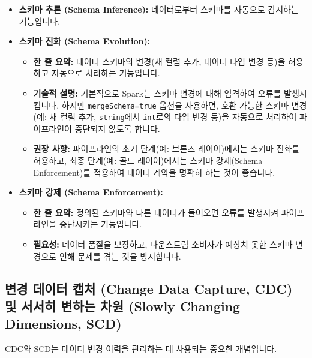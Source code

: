 \documentclass[11pt,a4paper]{article}
\theoremstyle{definition}
\begin{document}
\begin{itemize}
    \item \textbf{스키마 추론 (Schema Inference):} 데이터로부터 스키마를 자동으로 감지하는 기능입니다.
    \item \textbf{스키마 진화 (Schema Evolution):}
    \begin{itemize}
        \item \textbf{한 줄 요약:} 데이터 스키마의 변경(새 컬럼 추가, 데이터 타입 변경 등)을 허용하고 자동으로 처리하는 기능입니다.
        \item \textbf{기술적 설명:} 기본적으로 Spark는 스키마 변경에 대해 엄격하여 오류를 발생시킵니다. 하지만 \texttt{mergeSchema=true} 옵션을 사용하면, 호환 가능한 스키마 변경(예: 새 컬럼 추가, \texttt{string}에서 \texttt{int}로의 타입 변경 등)을 자동으로 처리하여 파이프라인이 중단되지 않도록 합니다.
        \item \textbf{권장 사항:} 파이프라인의 초기 단계(예: 브론즈 레이어)에서는 스키마 진화를 허용하고, 최종 단계(예: 골드 레이어)에서는 스키마 강제(Schema Enforcement)를 적용하여 데이터 계약을 명확히 하는 것이 좋습니다.
    \end{itemize}
    \item \textbf{스키마 강제 (Schema Enforcement):}
    \begin{itemize}
        \item \textbf{한 줄 요약:} 정의된 스키마와 다른 데이터가 들어오면 오류를 발생시켜 파이프라인을 중단시키는 기능입니다.
        \item \textbf{필요성:} 데이터 품질을 보장하고, 다운스트림 소비자가 예상치 못한 스키마 변경으로 인해 문제를 겪는 것을 방지합니다.
    \end{itemize}
\end{itemize}

\subsection{변경 데이터 캡처 (Change Data Capture, CDC) 및 서서히 변하는 차원 (Slowly Changing Dimensions, SCD)}
CDC와 SCD는 데이터 변경 이력을 관리하는 데 사용되는 중요한 개념입니다.
\end{document}
